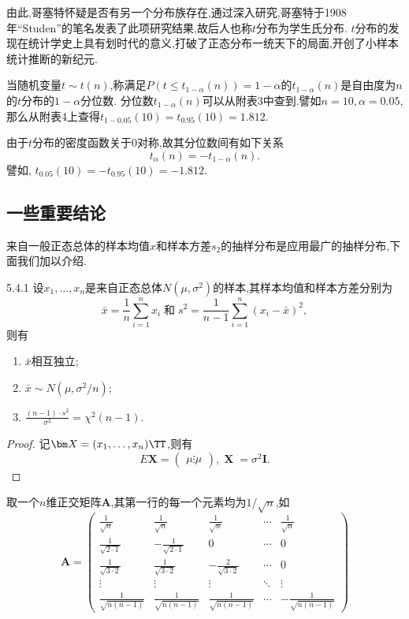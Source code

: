由此,哥塞特怀疑是否有另一个分布族存在,通过深入研究,哥塞特于1908年``Studen''的笔名发表了此项研究结果,故后人也称$t$分布为学生氏分布. $t$分布的发现在统计学史上具有划时代的意义,打破了正态分布一统天下的局面,开创了小样本统计推断的新纪元.

当随机变量$t\sim t(n)$,称满足$P(t\leq t_{1-\alpha}(n))=1-\alpha$的$t_{1-\alpha}(n)$是自由度为$n$的$t$分布的$1-\alpha$分位数. 分位数$t_{1-\alpha}(n)$可以从附表3中查到.譬如$n=10,\alpha=0.05$,那么从附表4上查得$t_{1-0.05}(10)=t_{0.95}(10)=1.812$.

由于$t$分布的密度函数关于0对称,故其分位数间有如下关系
\begin{equation}\label{eq:5.4.2}
t_\alpha(n)=-t_{1-\alpha}(n).
\end{equation}
譬如, $t_{0.05}(10)=-t_{0.95}(10)=-1.812$.
\subsection{一些重要结论}
来自一般正态总体的样本均值$x$和样本方差$s_2$的抽样分布是应用最广的抽样分布,下面我们加以介绍.
\begin{theorem}{}{5.4.1}
设$x_1,\dotsc,x_n$是来自正态总体$N(\mu,\sigma^2)$的样本,其样本均值和样本方差分别为
\[\bar x=\frac1n\sum_{i=1}^nx_i\;\text{和}\;s^2=\frac1{n-1}\sum_{i=1}^n(x_i-\bar x)^2,\]
则有
\begin{enumerate}[label=(\arabic*)]
\item $\bar x$相互独立;
\item $\bar x\sim N(\mu,\sigma^2/n)$;
\item $\frac{(n-1)\cdot s^2}{\sigma^2}=\chi^2(n-1)$.
\end{enumerate}
\end{theorem}
\begin{proof}
记$\bm X=(x_1,\dotsc,x_n)\TT$,则有
\[E\bm X=\begin{pmatrix}
\mu\vdots\mu
\end{pmatrix},\operatorname{\bm X}=\sigma^2 \bm I.\]
\end{proof}
取一个$n$维正交矩阵$\bm A$,其第一行的每一个元素均为$1/\sqrt n$,如
\[\bm A=\begin{pmatrix}
\frac1{\sqrt n}&\frac{1}{\sqrt n}&\frac1{\sqrt n}&\cdots&\frac1{\sqrt n}\\
\frac1{\sqrt{2\cdot1}}&-\frac1{\sqrt{2\cdot1}}&0&\cdots&0\\
\frac1{\sqrt{3\cdot2}}&\frac1{\sqrt{3\cdot2}}&-\frac2{\sqrt{3\cdot2}}&\cdots&0\\
\vdots&\vdots&\vdots&\ddots&\vdots\\
\frac1{\sqrt{n(n-1)}}&\frac1{\sqrt{n(n-1)}}&\frac1{\sqrt{n(n-1)}}&\cdots&
-\frac1{\sqrt{n(n-1)}}
\end{pmatrix}\]
